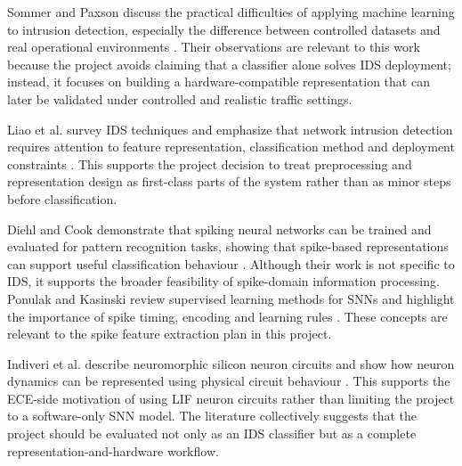 Sommer and Paxson discuss the practical difficulties of applying machine learning to intrusion detection, especially the difference between controlled datasets and real operational environments \cite{Sommer2010}. Their observations are relevant to this work because the project avoids claiming that a classifier alone solves IDS deployment; instead, it focuses on building a hardware-compatible representation that can later be validated under controlled and realistic traffic settings.

Liao et al. survey IDS techniques and emphasize that network intrusion detection requires attention to feature representation, classification method and deployment constraints \cite{Liao2013}. This supports the project decision to treat preprocessing and representation design as first-class parts of the system rather than as minor steps before classification.

Diehl and Cook demonstrate that spiking neural networks can be trained and evaluated for pattern recognition tasks, showing that spike-based representations can support useful classification behaviour \cite{Diehl2015}. Although their work is not specific to IDS, it supports the broader feasibility of spike-domain information processing. Ponulak and Kasinski review supervised learning methods for SNNs and highlight the importance of spike timing, encoding and learning rules \cite{Ponulak2011}. These concepts are relevant to the spike feature extraction plan in this project.

Indiveri et al. describe neuromorphic silicon neuron circuits and show how neuron dynamics can be represented using physical circuit behaviour \cite{Indiveri2011}. This supports the ECE-side motivation of using LIF neuron circuits rather than limiting the project to a software-only SNN model. The literature collectively suggests that the project should be evaluated not only as an IDS classifier but as a complete representation-and-hardware workflow.

